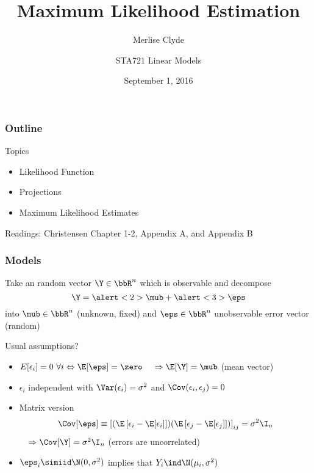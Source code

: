 \documentclass{beamer}
\title{Maximum Likelihood Estimation}
\subtitle{Merlise Clyde}
\author{STA721 Linear Models}
\institute{Duke University}
\date{September 1, 2016}
\begin{document}
\maketitle
\begin{frame}\frametitle{Outline}
Topics
  \begin{itemize}
 \item Likelihood Function
  \item Projections
  \item Maximum Likelihood Estimates


  \end{itemize}


Readings: Christensen Chapter 1-2, Appendix A, and Appendix B
\end{frame}


\begin{frame}
  \frametitle{Models}
Take an random vector $\Y \in \bbR^n$ which is observable and decompose  \pause
$$ \Y = \alert<2>{\mub} + \alert<3>{\eps}$$
into  \alert<2>{$\mub \in \bbR^n$ (unknown, fixed)} \pause and
\alert<3>{$\eps \in \bbR^n$ unobservable error vector (random)}
\pause

\vspace{18pt}
Usual assumptions? \pause
\begin{itemize}
\item $E[\epsilon_i] = 0 \ \forall i \Leftrightarrow \E[\eps] = \zero$ \pause  $ \quad \Rightarrow \E[\Y] = \mub$
  (mean vector) \pause
\item $\epsilon_i$ independent with $\Var(\epsilon_i) = \sigma^2$ and
  $\Cov(\epsilon_i, \epsilon_j) = 0$  
\item Matrix version $$\Cov[\eps] \equiv \left[ (\E\left[\epsilon_i -
  \E[\epsilon_i]\right])(\E\left[\epsilon_j - \E[\epsilon_j]\right])\right]_{ij} = \sigma^2 \I_n$$   \pause  $ \quad \Rightarrow
  \Cov[\Y] = \sigma^2 \I_n$  (errors are uncorrelated) \pause
\item $\eps_i \simiid \N(0, \sigma^2)$  implies that $Y_i \ind \N(\mu_i, \sigma^2)$
\end{itemize}

\end{frame}
\end{document}
